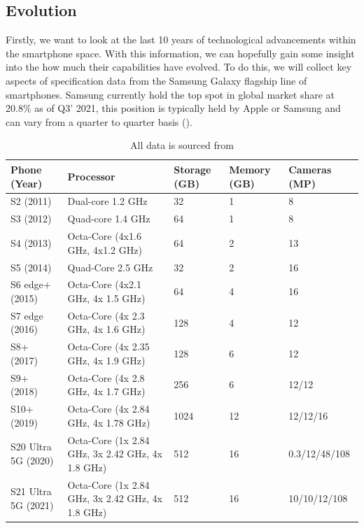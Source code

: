 \documentclass{article}
\begin{document}
\subsection{Evolution}
Firstly, we want to look at the last 10 years of technological advancements within the smartphone space. 
With this information, we can hopefully gain some insight into the how much their capabilities have evolved. To do this,
 we will collect key aspects of specification data from the Samsung Galaxy flagship line of smartphones. Samsung currently hold the 
 top spot in global market share at 20.8\% as of Q3’ 2021, this position is typically held by Apple or Samsung and can 
 vary from a quarter to quarter basis (\cite{odea2021}).
 \newpage
\begin{table}[h!]
    \centering
    \begin{tabular}{ |m{2.5cm}|m{2.7cm}|m{1cm}|m{1.2cm}|m{2.5cm}| }
        \hline
        Phone (Year) & Processor & Storage (GB) & Memory (GB) & Cameras (MP) \\
        \hline
        \hline
        S2 (2011) & Dual-core 1.2 GHz & 32 & 1 & 8 \\
        \hline
        S3 (2012) & Quad-core 1.4 GHz & 64 & 1 & 8 \\
        \hline
        S4 (2013) & Octa-Core (4x1.6 GHz, 4x1.2 GHz) & 64 & 2 & 13 \\
        \hline
        S5 (2014) & Quad-Core 2.5 GHz & 32 & 2 & 16 \\
        \hline
        S6 edge+ (2015) & Octa-Core (4x2.1 GHz, 4x 1.5 GHz) & 64 & 4 & 16 \\
        \hline
        S7 edge (2016) & Octa-Core (4x 2.3 GHz, 4x 1.6 GHz) & 128 &	4 &	12 \\
        \hline
        S8+ (2017) & Octa-Core (4x 2.35 GHz, 4x 1.9 GHz) & 128 & 6 & 12 \\
        \hline
        S9+ (2018) & Octa-Core (4x 2.8 GHz, 4x 1.7 GHz) & 256 &	6 &	12/12 \\
        \hline
        S10+ (2019) & Octa-Core (4x 2.84 GHz, 4x 1.78 GHz) & 1024 &	12 & 12/12/16 \\
        \hline
        S20 Ultra 5G (2020) & Octa-Core (1x 2.84 GHz, 3x 2.42 GHz, 4x 1.8 GHz) & 512 & 16 & 0.3/12/48/108 \\
        \hline
        S21 Ultra 5G (2021) & Octa-Core (1x 2.84 GHz, 3x 2.42 GHz, 4x 1.8 GHz) & 512 & 16 &	10/10/12/108 \\
        \hline
    \end{tabular}
    \caption{All data is sourced from \cite{gsm}}
    \label{table:1}
\end{table}
\end{document}

